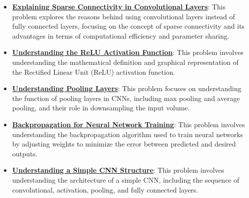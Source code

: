 \documentclass{article}%
\begin{document}
\begin{itemize}[leftmargin=*]
\item \href{https://purdue.brightspace.com/d2l/common/assets/pdfjs-d2l-dist/1.0.14-legacy/web/viewer.html?file=\%2Fcontent\%2Fenforced\%2F1095467-wl.202510.CS.24300.001\%2F09L1-cnn.pdf\%3Fou\%3D1095467\&lang=en-us\&container=d2l-fileviewer-rendered-pdf\&fullscreen=d2l-fileviewer-rendered-pdf-dialog\&height=667#page=10}{\textbf{Explaining Sparse Connectivity in Convolutional Layers}}: This problem explores the reasons behind using convolutional layers instead of fully connected layers, focusing on the concept of sparse connectivity and its advantages in terms of computational efficiency and parameter sharing.%
\item \href{https://purdue.brightspace.com/d2l/common/assets/pdfjs-d2l-dist/1.0.14-legacy/web/viewer.html?file=\%2Fcontent\%2Fenforced\%2F1095467-wl.202510.CS.24300.001\%2F09L1-cnn.pdf\%3Fou\%3D1095467\&lang=en-us\&container=d2l-fileviewer-rendered-pdf\&fullscreen=d2l-fileviewer-rendered-pdf-dialog\&height=667#page=13}{\textbf{Understanding the ReLU Activation Function}}: This problem involves understanding the mathematical definition and graphical representation of the Rectified Linear Unit (ReLU) activation function.%
\item \href{https://purdue.brightspace.com/d2l/common/assets/pdfjs-d2l-dist/1.0.14-legacy/web/viewer.html?file=\%2Fcontent\%2Fenforced\%2F1095467-wl.202510.CS.24300.001\%2F09L1-cnn.pdf\%3Fou\%3D1095467\&lang=en-us\&container=d2l-fileviewer-rendered-pdf\&fullscreen=d2l-fileviewer-rendered-pdf-dialog\&height=667#page=14}{\textbf{Understanding Pooling Layers}}: This problem focuses on understanding the function of pooling layers in CNNs, including max pooling and average pooling, and their role in downsampling the input volume.%
\item \href{https://purdue.brightspace.com/d2l/common/assets/pdfjs-d2l-dist/1.0.14-legacy/web/viewer.html?file=\%2Fcontent\%2Fenforced\%2F1095467-wl.202510.CS.24300.001\%2F09L1-cnn.pdf\%3Fou\%3D1095467\&lang=en-us\&container=d2l-fileviewer-rendered-pdf\&fullscreen=d2l-fileviewer-rendered-pdf-dialog\&height=667#page=16}{\textbf{Backpropagation for Neural Network Training}}: This problem involves understanding the backpropagation algorithm used to train neural networks by adjusting weights to minimize the error between predicted and desired outputs.%
\item \href{https://purdue.brightspace.com/d2l/common/assets/pdfjs-d2l-dist/1.0.14-legacy/web/viewer.html?file=\%2Fcontent\%2Fenforced\%2F1095467-wl.202510.CS.24300.001\%2F09L1-cnn.pdf\%3Fou\%3D1095467\&lang=en-us\&container=d2l-fileviewer-rendered-pdf\&fullscreen=d2l-fileviewer-rendered-pdf-dialog\&height=667#page=17}{\textbf{Understanding a Simple CNN Structure}}: This problem involves understanding the architecture of a simple CNN, including the sequence of convolutional, activation, pooling, and fully connected layers.%

\end{itemize}
\end{document}
